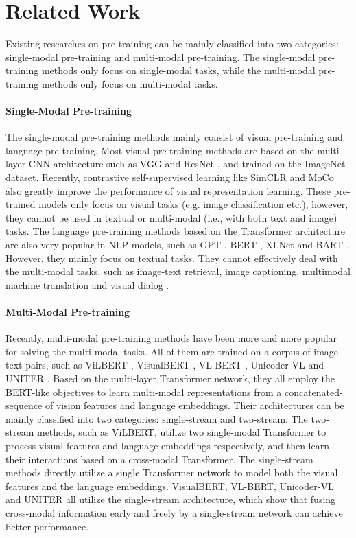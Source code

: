 \documentclass[11pt,a4paper]{article}
\begin{document}
\section{Related Work}
\label{sec:rel}
Existing researches on pre-training can be mainly classified into two categories: single-modal pre-training and multi-modal pre-training.
The single-modal pre-training methods only focus on single-modal tasks, while the multi-modal pre-training methods only focus on multi-modal tasks.

\paragraph{Single-Modal Pre-training}
The single-modal pre-training methods mainly consist of visual pre-training and language pre-training.
Most visual pre-training methods are based on the multi-layer CNN architecture such as VGG \citep{simonyan2014very} and ResNet \citep{he2016deep}, and trained on the ImageNet dataset.
Recently, contrastive self-supervised learning like SimCLR \citep{chen2020simple} and MoCo \citep{he2020momentum} also greatly improve the performance of visual representation learning.
These pre-trained models only focus on visual tasks (e.g. image classification etc.), however, they cannot be used in textual or multi-modal (i.e., with both text and image) tasks.
The language pre-training methods based on the Transformer architecture are also very popular in NLP models, such as GPT \citep{radford2018improving}, BERT \citep{devlin-etal-2019-bert}, XLNet \citep{yang2019xlnet} and BART \citep{lewis-etal-2020-bart}.
However, they mainly focus on textual tasks.
They cannot effectively deal with the multi-modal tasks, such as image-text retrieval, image captioning, multimodal machine translation \citep{lin2020dynamic,su2021multi} and visual dialog \citep{murahari2020large}.

\paragraph{Multi-Modal Pre-training}
Recently, multi-modal pre-training methods have been more and more popular for solving the multi-modal tasks.
All of them are trained on a corpus of image-text pairs, such as ViLBERT \citep{lu2019vilbert}, VisualBERT \citep{li2019visualbert}, VL-BERT \citep{su2019vl}, Unicoder-VL \citep{li2019unicoder} and UNITER \citep{chen2020uniter}.
Based on the multi-layer Transformer network, they all employ the BERT-like objectives to learn multi-modal representations from a concatenated-sequence of vision features and language embeddings.
Their architectures can be mainly classified into two categories: single-stream and two-stream.
The two-stream methods, such as ViLBERT, utilize two single-modal Transformer to process visual features and language embeddings respectively, and then learn their interactions based on a cross-modal Transformer.
The single-stream methods directly utilize a single Transformer network to model both the visual features and the language embeddings. 
VisualBERT, VL-BERT, Unicoder-VL and UNITER all utilize the single-stream architecture, which show that fusing cross-modal information early and freely by a single-stream network can achieve better performance.
\end{document}

